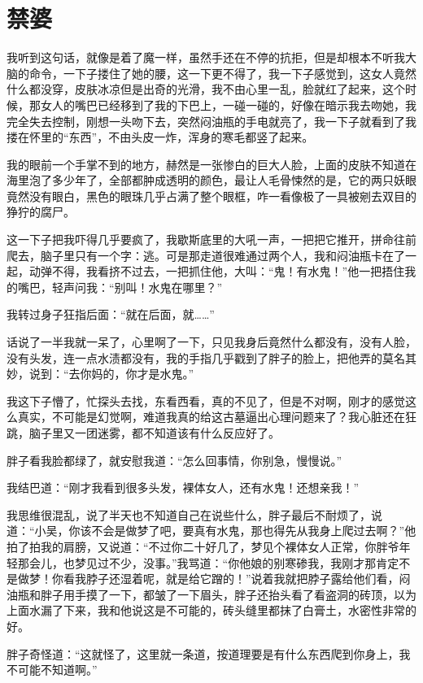 \chapter{禁婆}

我听到这句话，就像是着了魔一样，虽然手还在不停的抗拒，但是却根本不听我大脑的命令，一下子搂住了她的腰，这一下更不得了，我一下子感觉到，这女人竟然什么都没穿，皮肤冰凉但是出奇的光滑，我不由心里一乱，脸就红了起来，这个时候，那女人的嘴巴已经移到了我的下巴上，一碰一碰的，好像在暗示我去吻她，我完全失去控制，刚想一头吻下去，突然闷油瓶的手电就亮了，我一下子就看到了我搂在怀里的“东西”，不由头皮一炸，浑身的寒毛都竖了起来。

我的眼前一个手掌不到的地方，赫然是一张惨白的巨大人脸，上面的皮肤不知道在海里泡了多少年了，全部都肿成透明的颜色，最让人毛骨悚然的是，它的两只妖眼竟然没有眼白，黑色的眼珠几乎占满了整个眼框，咋一看像极了一具被剜去双目的狰狞的腐尸。

这一下子把我吓得几乎要疯了，我歇斯底里的大吼一声，一把把它推开，拼命往前爬去，脑子里只有一个字：逃。可是那走道很难通过两个人，我和闷油瓶卡在了一起，动弹不得，我看挤不过去，一把抓住他，大叫：“鬼！有水鬼！”他一把捂住我的嘴巴，轻声问我：“别叫！水鬼在哪里？”

我转过身子狂指后面：“就在后面，就……”

话说了一半我就一呆了，心里啊了一下，只见我身后竟然什么都没有，没有人脸，没有头发，连一点水渍都没有，我的手指几乎戳到了胖子的脸上，把他弄的莫名其妙，说到：“去你妈的，你才是水鬼。”

我这下子懵了，忙探头去找，东看西看，真的不见了，但是不对啊，刚才的感觉这么真实，不可能是幻觉啊，难道我真的给这古墓逼出心理问题来了？我心脏还在狂跳，脑子里又一团迷雾，都不知道该有什么反应好了。

胖子看我脸都绿了，就安慰我道：“怎么回事情，你别急，慢慢说。”

我结巴道：“刚才我看到很多头发，裸体女人，还有水鬼！还想亲我！”

我思维很混乱，说了半天也不知道自己在说些什么，胖子最后不耐烦了，说道：“小吴，你该不会是做梦了吧，要真有水鬼，那也得先从我身上爬过去啊？”他拍了拍我的肩膀，又说道：“不过你二十好几了，梦见个裸体女人正常，你胖爷年轻那会儿，也梦见过不少，没事。”我骂道：“你他娘的别寒碜我，我刚才那肯定不是做梦！你看我脖子还湿着呢，就是给它蹭的！”说着我就把脖子露给他们看，闷油瓶和胖子用手摸了一下，都皱了一下眉头，胖子还抬头看了看盗洞的砖顶，以为上面水漏了下来，我和他说这是不可能的，砖头缝里都抹了白膏土，水密性非常的好。

胖子奇怪道：“这就怪了，这里就一条道，按道理要是有什么东西爬到你身上，我不可能不知道啊。”


